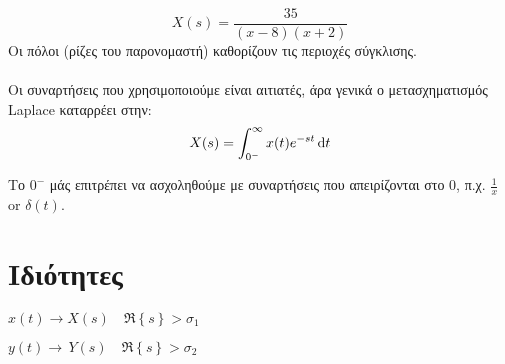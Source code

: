 \documentclass[11pt,a4paper,titlepage,fleqn]{article}
\begin{document}
	\[
	X(s) = \frac{35}{(x-8)(x+2)}
	\]
	Οι πόλοι (ρίζες του παρονομαστή) καθορίζουν τις περιοχές σύγκλισης.
	
	\paragraph{}
	Οι συναρτήσεις που χρησιμοποιούμε είναι αιτιατές, άρα γενικά ο μετασχηματισμός
	Laplace καταρρέει στην:
	\[
	X(s) = \int_{0^-}^{\infty} x(t)e^{-st}\dif t
	\]
	
	Το \( 0^- \) μάς επιτρέπει να ασχοληθούμε με συναρτήσεις που απειρίζονται
	στο 0, π.χ. \( \frac{1}{x} \) or \( \delta(t) \).
	
	\section{Ιδιότητες}
	\( x(t)\to X(s) \quad \Re\left\lbrace s \right\rbrace > \sigma_1 \)
	
	\( y(t)\to\, Y(s) \quad \Re\left\lbrace s \right\rbrace > \sigma_2 \)
	
\end{document}
